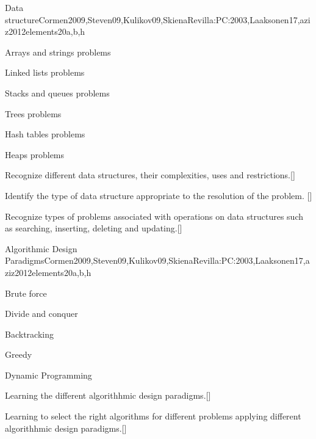 \begin{syllabus}
  \begin{unit}{Data structure}{}{Cormen2009,Steven09,Kulikov09,SkienaRevilla:PC:2003,Laaksonen17,aziz2012elements}{20}{a,b,h}
    \begin{topics}
      \item Arrays and strings problems
      \item Linked lists problems
      \item Stacks and queues problems
      \item Trees problems
      \item Hash tables problems
      \item Heaps problems
    \end{topics}
    \begin{learningoutcomes}
        \item Recognize different data structures, their complexities, uses and restrictions.[\Usage]
        \item Identify the type of data structure appropriate to the resolution of the problem. [\Usage]
        \item Recognize types of problems associated with operations on data structures such as searching, inserting, deleting and updating.[\Usage]
    \end{learningoutcomes}
  \end{unit}
  
  \begin{unit}{Algorithmic Design Paradigms}{}{Cormen2009,Steven09,Kulikov09,SkienaRevilla:PC:2003,Laaksonen17,aziz2012elements}{20}{a,b,h}
    \begin{topics}
      \item Brute force
      \item Divide and conquer
      \item Backtracking
      \item Greedy
      \item Dynamic Programming
    \end{topics}
    \begin{learningoutcomes}
        \item Learning the different algorithhmic design paradigms.[\Usage]   
        \item Learning to select the right algorithms for different problems applying different algorithhmic design paradigms.[\Usage]
    \end{learningoutcomes}
  \end{unit}
  

\end{syllabus}
